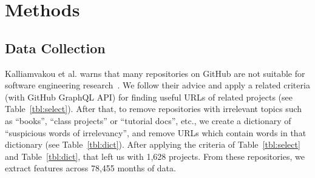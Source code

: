 \documentclass[sigconf,anonymous,review]{acmart}
\begin{document}














\section{Methods}
\label{sect:empir} 
\subsection{Data Collection}
\label{sect:data_collect}

Kalliamvakou et al. warns that  many repositories on GitHub are not suitable for   software engineering research~\cite{kalliamvakou2016depth}. We follow their advice and apply a related criteria (with GitHub GraphQL API) for finding useful URLs of related projects (see Table~\ref{tbl:select}).
After that, to remove repositories with irrelevant topics such as ``books'', ``class projects'' or ``tutorial docs'', etc., we create a dictionary of ``suspicious words of irrelevancy'', and remove URLs which contain words in that dictionary (see  Table~\ref{tbl:dict}). After applying the criteria of Table~\ref{tbl:select} and Table~\ref{tbl:dict}, that left us with 1,628 projects. From these repositories, we extract features across 78,455 months of data.
\end{document}
